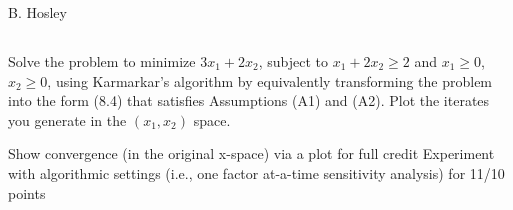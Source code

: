 \documentclass[12pt]{amsart}
\begin{document}
\raggedbottom

\hspace{\fill} {\large B. Hosley}
\bigskip


\setcounter{section}{8}
\setcounter{subsection}{0}
\subsection{}
Solve the problem to minimize  \(3x_1 + 2x_2\), subject to \(x_1 + 2x_2 \geq 2\) and \(x_1 \geq 0\), 
\(x_2 \geq 0\), using Karmarkar's algorithm by equivalently transforming the problem into 
the form (8.4) that satisfies Assumptions (A1) and (A2). Plot the iterates you 
generate in the \(( x_1 ,x_2 )\) space.




Show convergence (in the original x-space) via a plot for full credit
Experiment with algorithmic settings (i.e., one factor at-a-time sensitivity analysis) for 11/10 points
\end{document}
